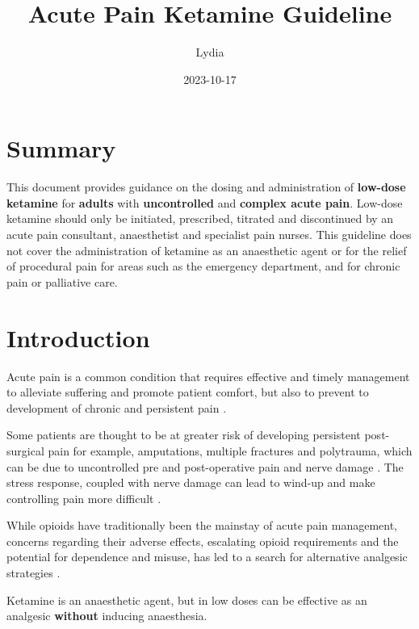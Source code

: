 \documentclass[
]{book}
\title{Acute Pain Ketamine Guideline}
\author{Lydia}
\date{2023-10-17}
\begin{document}
\maketitle

{
\setcounter{tocdepth}{1}
\tableofcontents
}
\hypertarget{summary}{%
\chapter{Summary}\label{summary}}

This document provides guidance on the dosing and administration of \textbf{low-dose ketamine} for \textbf{adults} with \textbf{uncontrolled} and \textbf{complex acute pain}.\citep{Brinck_2018} Low-dose ketamine should only be initiated, prescribed, titrated and discontinued by an acute pain consultant, anaesthetist and specialist pain nurses. This guideline does not cover the administration of ketamine as an anaesthetic agent or for the relief of procedural pain for areas such as the emergency department, and for chronic pain or palliative care.

\hypertarget{introduction}{%
\chapter{Introduction}\label{introduction}}

Acute pain is a common condition that requires effective and timely management to alleviate suffering and promote patient comfort, but also to prevent to development of chronic and persistent pain \citep{Brinck_2018}.

Some patients are thought to be at greater risk of developing persistent post-surgical pain for example, amputations, multiple fractures and polytrauma, which can be due to uncontrolled pre and post-operative pain and nerve damage \citep{Bell_2005}. The stress response, coupled with nerve damage can lead to wind-up and make controlling pain more difficult \citep{Mathew_2014}.

While opioids have traditionally been the mainstay of acute pain management, concerns regarding their adverse effects, escalating opioid requirements and the potential for dependence and misuse, has led to a search for alternative analgesic strategies \citep{Eipe_2018}.

Ketamine is an anaesthetic agent, but in low doses can be effective as an analgesic \textbf{without} inducing anaesthesia.
\end{document}
